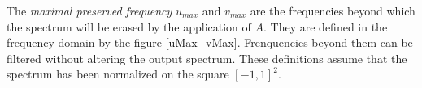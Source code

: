		The \emph{maximal preserved frequency}  $u_{max}$ and $v_{max}$ are the frequencies beyond which the spectrum will be erased by the application of $A$. They are defined in the frequency domain by the figure \ref{uMax_vMax}. Frenquencies beyond them can be filtered without altering the output spectrum. These definitions assume that the spectrum has been normalized on the square $[-1,1]^2$.
		
		

